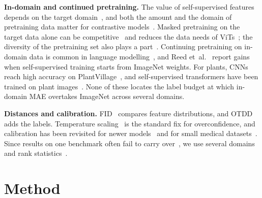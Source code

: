\documentclass[conference]{IEEEtran}
\begin{document}
\textbf{In-domain and continued pretraining.} The value of self-supervised features depends on the target
domain~\cite{ericsson2021transfer}, and both the amount and the domain of pretraining data matter for contrastive
models~\cite{cole2022contrastive}. Masked pretraining on the target data alone can be
competitive~\cite{elnouby2021largescale,zhou2022selfpretrain} and reduces the data needs of
ViTs~\cite{mao2022maedatahungry,das2024limited}; the diversity of the pretraining set also plays a
part~\cite{hammoud2024diversity}. Continuing pretraining on in-domain data is common in language
modelling~\cite{gururangan2020dontstop}, and Reed et~al.~\cite{reed2022hpt} report gains when self-supervised
training starts from ImageNet weights. For plants, CNNs reach high accuracy on
PlantVillage~\cite{hughes2015plantvillage,mohanty2016plant}, and self-supervised transformers have been trained on
plant images~\cite{wang2024gpid}. None of these locates the label budget at which in-domain MAE overtakes ImageNet
across several domains.

\textbf{Distances and calibration.} FID~\cite{heusel2017fid} compares feature distributions, and
OTDD~\cite{alvarezmelis2020otdd} adds the labels. Temperature scaling~\cite{guo2017calibration} is the standard fix
for overconfidence, and calibration has been revisited for newer models~\cite{minderer2021calibration} and for small
medical datasets~\cite{sambyal2023calibration}. Since results on one benchmark often fail to carry
over~\cite{dehghani2021lottery}, we use several domains and rank statistics~\cite{demsar2006comparisons}.

\section{Method}
\end{document}
